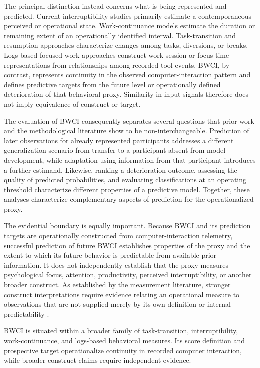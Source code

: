 The principal distinction instead concerns what is being represented and predicted. Current-interruptibility studies primarily estimate a contemporaneous perceived or operational state. Work-continuance models estimate the duration or remaining extent of an operationally identified interval. Task-transition and resumption approaches characterize changes among tasks, diversions, or breaks. Logs-based focused-work approaches construct work-session or focus-time representations from relationships among recorded tool events. BWCI, by contrast, represents continuity in the observed computer-interaction pattern and defines predictive targets from the future level or operationally defined deterioration of that behavioral proxy. Similarity in input signals therefore does not imply equivalence of construct or target.

The evaluation of BWCI consequently separates several questions that prior work and the methodological literature show to be non-interchangeable. Prediction of later observations for already represented participants addresses a different generalization scenario from transfer to a participant absent from model development, while adaptation using information from that participant introduces a further estimand. Likewise, ranking a deterioration outcome, assessing the quality of predicted probabilities, and evaluating classifications at an operating threshold characterize different properties of a predictive model. Together, these analyses characterize complementary aspects of prediction for the operationalized proxy.

The evidential boundary is equally important. Because BWCI and its prediction targets are operationally constructed from computer-interaction telemetry, successful prediction of future BWCI establishes properties of the proxy and the extent to which its future behavior is predictable from available prior information. It does not independently establish that the proxy measures psychological focus, attention, productivity, perceived interruptibility, or another broader construct. As established by the measurement literature, stronger construct interpretations require evidence relating an operational measure to observations that are not supplied merely by its own definition or internal predictability \parencite{cronbach1955constructValidity,jacobs2021measurement}.

BWCI is situated within a broader family of task-transition, interruptibility, work-continuance, and logs-based behavioral measures. Its score definition and prospective target operationalize continuity in recorded computer interaction, while broader construct claims require independent evidence.

